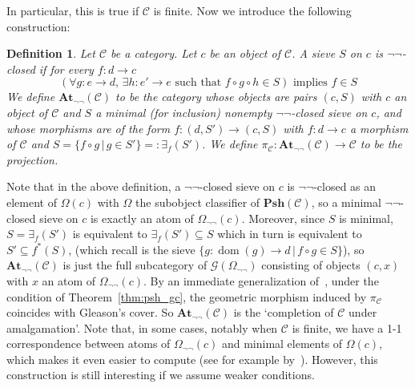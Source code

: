 \documentclass{article}
\newtheorem{definition}[theorem]{Definition}
\newcommand{\At}{\mathbf{At}}
\newcommand{\Psh}{\mathbf{Psh}}
\newcommand{\dom}{{\operatorname{dom}}}
\begin{document}
\noindent In particular, this is true if $\mathcal{C}$ is finite. Now we introduce the following construction:
\begin{definition}
    Let $\mathcal{C}$ be a category. Let $c$ be an object of $\mathcal{C}$. A sieve $S$ on $c$ is \emph{$\neg\neg$-closed} if for every $f:d\to c$ 
\[(\forall g:e\to d,\,\exists h:e'\to e\text{ such that } f\circ g\circ h\in S) \text{ implies } f\in S\]
    We define $\At_{\neg\neg}(\mathcal{C})$ to be the category whose objects are pairs $(c,S)$ with $c$ an object of $\mathcal{C}$ and $S$ a minimal (for inclusion) nonempty $\neg\neg$-closed sieve on $c$, and whose morphisms are of the form $f:(d,S')\to (c,S)$ with $f:d\to c$ a morphism of $\mathcal{C}$ and $S=\{f\circ g\,|\,g\in S'\}=:\exists_f(S')$. We define $\pi_\mathcal{C}:\At_{\neg\neg}(\mathcal{C})\to\mathcal{C}$ to be the projection.
\end{definition}

Note that in the above definition, a $\neg\neg$-closed sieve on $c$ is $\neg\neg$-closed as an element of $\Omega(c)$ with $\Omega$ the subobject classifier of $\Psh(\mathcal{C})$, so a minimal $\neg\neg$-closed sieve on $c$ is exactly an atom of $\Omega_{\neg\neg}(c)$. Moreover, since $S$ is minimal, $S=\exists_f(S')$ is equivalent to $\exists_f(S')\subseteq S$ which in turn is equivalent to $S'\subseteq f^*(S)$, (which recall is the sieve $\{g:\dom(g)\to d\,|\,f\circ g\in S\}$), so $\At_{\neg\neg}(\mathcal{C})$ is just the full subcategory of $\mathcal{G}(\Omega_{\neg\neg})$ consisting of objects $(c,x)$ with $x$ an atom of $\Omega_{\neg\neg}(c)$. By an immediate generalization of~\cite[Theorem 4.2]{johnstone1980gleason}, under the condition of Theorem~\ref{thm:psh_gc}, the geometric morphism induced by $\pi_\mathcal{C}$ coincides with Gleason's cover. So $\At_{\neg\neg}(\mathcal{C})$ is the `completion of $\mathcal{C}$ under amalgamation'. Note that, in some cases, notably when $\mathcal{C}$ is finite, we have a 1-1 correspondence between atoms of $\Omega_{\neg\neg}(c)$ and minimal elements of $\Omega(c)$, which makes it even easier to compute (see for example by~\cite[Lemma 4.1]{johnstone1980gleason}). However, this construction is still interesting if we assume weaker conditions. 
\end{document}
